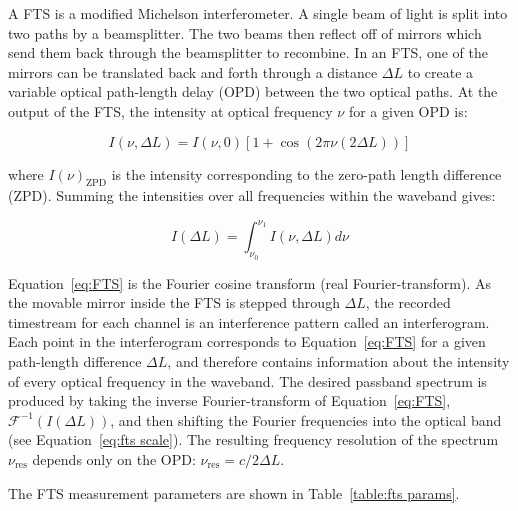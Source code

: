 A FTS is a modified Michelson interferometer. A single beam of light is split into two paths by a beamsplitter. The two beams then reflect off of mirrors which send them back through the beamsplitter to recombine. In an FTS, one of the mirrors can be translated back and forth through a distance $\Delta L$ to create a variable optical path-length delay (OPD) between the two optical paths. At the output of the FTS, the intensity at optical frequency $\nu$ for a given OPD is:

\begin{equation}
  I(\nu, \Delta L) = I(\nu, 0) \left[1 + \cos(2\pi \nu (2 \Delta L))\right]
\end{equation}

where $I(\nu)_{\mathrm{ZPD}}$ is the intensity corresponding to the zero-path length difference (ZPD). Summing the intensities over all frequencies within the waveband gives:

\begin{equation}\label{eq:FTS}
  I(\Delta L) = \int_{\nu_{0}}^{\nu_{1}} I(\nu, \Delta L) d\nu
\end{equation}

Equation~\ref{eq:FTS} is the Fourier cosine transform (real Fourier-transform). As the movable mirror inside the FTS is stepped through $\Delta L$, the recorded timestream for each channel is an interference pattern called an interferogram. Each point in the interferogram corresponds to Equation~\ref{eq:FTS} for a given path-length difference $\Delta L$, and therefore contains information about the intensity of every optical frequency in the waveband. The desired passband spectrum is produced by taking the inverse Fourier-transform of Equation~\ref{eq:FTS}, $\mathcal{F}^{-1}(I(\Delta L))$, and then shifting the Fourier frequencies into the optical band (see Equation~\ref{eq:fts scale}). The resulting frequency resolution of the spectrum $\nu_{\mathrm{res}}$ depends only on the OPD\@: $\nu_{\mathrm{res}} = c/2 \Delta L$.

The FTS measurement parameters are shown in Table~\ref{table:fts params}.

